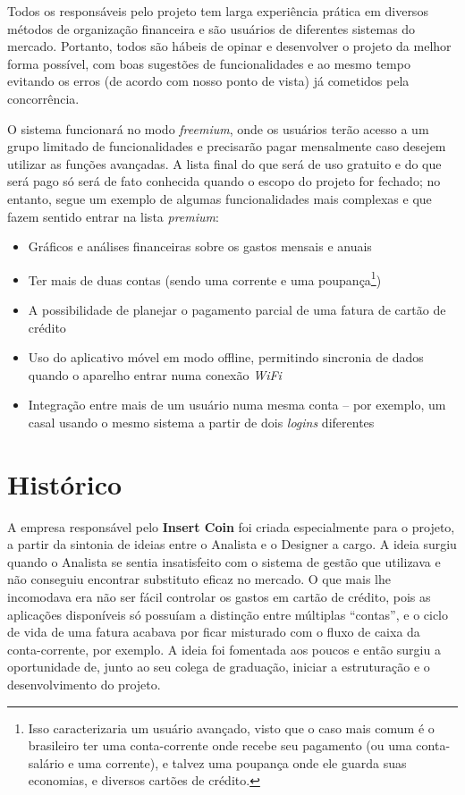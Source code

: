 \documentclass[a4paper]{abnt}
\begin{document}
Todos os responsáveis pelo projeto tem larga experiência prática em diversos métodos de organização financeira e são usuários de diferentes sistemas do mercado. Portanto, todos são hábeis de opinar e desenvolver o projeto da melhor forma possível, com boas sugestões de funcionalidades e ao mesmo tempo evitando os erros (de acordo com nosso ponto de vista) já cometidos pela concorrência.

O sistema funcionará no modo \textit{freemium}, onde os usuários terão acesso a um grupo limitado de funcionalidades e precisarão pagar mensalmente caso desejem utilizar as funções avançadas. A lista final do que será de uso gratuito e do que será pago só será de fato conhecida quando o escopo do projeto for fechado; no entanto, segue um exemplo de algumas funcionalidades mais complexas e que fazem sentido entrar na lista \textit{premium}:
\begin{itemize}
	\item Gráficos e análises financeiras sobre os gastos mensais e anuais
	\item Ter mais de duas contas (sendo uma corrente e uma poupança\footnote{Isso caracterizaria um usuário avançado, visto que o caso mais comum é o brasileiro ter uma conta-corrente onde recebe seu pagamento (ou uma conta-salário e uma corrente), e talvez uma poupança onde ele guarda suas economias, e diversos cartões de crédito.})
	\item A possibilidade de planejar o pagamento parcial de uma fatura de cartão de crédito
	\item Uso do aplicativo móvel em modo offline, permitindo sincronia de dados quando o aparelho entrar numa conexão \textit{WiFi}
	\item Integração entre mais de um usuário numa mesma conta -- por exemplo, um casal usando o mesmo sistema a partir de dois \textit{logins} diferentes
\end{itemize}
 
\section{Histórico}
A empresa responsável pelo \textbf{Insert Coin} foi criada especialmente para o projeto, a partir da sintonia de ideias entre o Analista e o Designer a cargo. A ideia surgiu quando o Analista se sentia insatisfeito com o sistema de gestão que utilizava e não conseguiu encontrar substituto eficaz no mercado. O que mais lhe incomodava era não ser fácil controlar os gastos em cartão de crédito, pois as aplicações disponíveis só possuíam a distinção entre múltiplas ``contas'', e o ciclo de vida de uma fatura acabava por ficar misturado com o fluxo de caixa da conta-corrente, por exemplo. A ideia foi fomentada aos poucos e então surgiu a oportunidade de, junto ao seu colega de graduação, iniciar a estruturação e o desenvolvimento do projeto.
\end{document}
